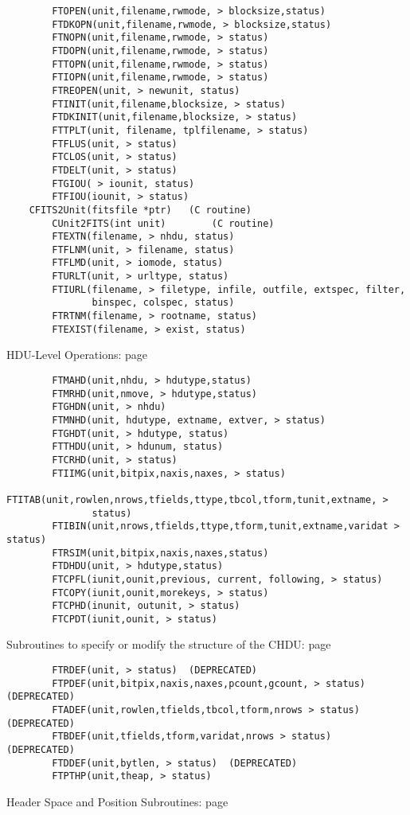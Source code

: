 \documentclass[11pt]{book}
\begin{document}
\begin{verbatim}
        FTOPEN(unit,filename,rwmode, > blocksize,status)
        FTDKOPN(unit,filename,rwmode, > blocksize,status)
        FTNOPN(unit,filename,rwmode, > status)
        FTDOPN(unit,filename,rwmode, > status)
        FTTOPN(unit,filename,rwmode, > status)
        FTIOPN(unit,filename,rwmode, > status)
        FTREOPEN(unit, > newunit, status)
        FTINIT(unit,filename,blocksize, > status)
        FTDKINIT(unit,filename,blocksize, > status)
        FTTPLT(unit, filename, tplfilename, > status)
        FTFLUS(unit, > status)
        FTCLOS(unit, > status)
        FTDELT(unit, > status)
        FTGIOU( > iounit, status)
        FTFIOU(iounit, > status)
	CFITS2Unit(fitsfile *ptr)   (C routine)
        CUnit2FITS(int unit)        (C routine)
        FTEXTN(filename, > nhdu, status)
        FTFLNM(unit, > filename, status)
        FTFLMD(unit, > iomode, status)
        FTURLT(unit, > urltype, status)
        FTIURL(filename, > filetype, infile, outfile, extspec, filter,
               binspec, colspec, status)
        FTRTNM(filename, > rootname, status)
        FTEXIST(filename, > exist, status)
\end{verbatim}
 HDU-Level Operations: page~\pageref{FTMAHD}

\begin{verbatim}
        FTMAHD(unit,nhdu, > hdutype,status)
        FTMRHD(unit,nmove, > hdutype,status)
        FTGHDN(unit, > nhdu)
        FTMNHD(unit, hdutype, extname, extver, > status)
        FTGHDT(unit, > hdutype, status)
        FTTHDU(unit, > hdunum, status)
        FTCRHD(unit, > status)
        FTIIMG(unit,bitpix,naxis,naxes, > status)
        FTITAB(unit,rowlen,nrows,tfields,ttype,tbcol,tform,tunit,extname, >
               status)
        FTIBIN(unit,nrows,tfields,ttype,tform,tunit,extname,varidat > status)
        FTRSIM(unit,bitpix,naxis,naxes,status)
        FTDHDU(unit, > hdutype,status)
        FTCPFL(iunit,ounit,previous, current, following, > status)
        FTCOPY(iunit,ounit,morekeys, > status)
        FTCPHD(inunit, outunit, > status)
        FTCPDT(iunit,ounit, > status)
\end{verbatim}
 Subroutines to specify or modify the structure of the CHDU: page~\pageref{FTRDEF}

\begin{verbatim}
        FTRDEF(unit, > status)  (DEPRECATED)
        FTPDEF(unit,bitpix,naxis,naxes,pcount,gcount, > status)  (DEPRECATED)
        FTADEF(unit,rowlen,tfields,tbcol,tform,nrows > status)  (DEPRECATED)
        FTBDEF(unit,tfields,tform,varidat,nrows > status)  (DEPRECATED)
        FTDDEF(unit,bytlen, > status)  (DEPRECATED)
        FTPTHP(unit,theap, > status)
\end{verbatim}
 Header Space and Position Subroutines: page~\pageref{FTHDEF}
\end{document}
